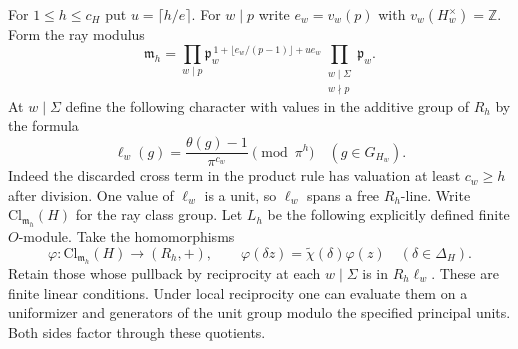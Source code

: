 \documentclass[a4paper,11pt]{article}
\theoremstyle{definition}
\theoremstyle{remark}
\newcommand{\ZZ}{\mathbb Z}\newcommand{\ord}{\operatorname{ord}}
\numberwithin{equation}{section}
\begin{document}
For \(1\le h\le c_H\) put \(u=\lceil h/e\rceil\). For \(w\mid p\)
write \(e_w=v_w(p)\) with \(v_w(H_w^\times)=\ZZ\). Form the ray modulus
\[
 \mathfrak m_h=
 \prod_{w\mid p}\mathfrak p_w^{\,1+\lfloor e_w/(p-1)\rfloor+u e_w}
 \prod_{\substack{w\mid\Sigma\\w\nmid p}}\mathfrak p_w .
\]
At \(w\mid\Sigma\) define the following character with values in
the additive group of \(R_h\) by the formula
\[
         \ell_w(g)=\frac{\theta(g)-1}{\pi^{c_w}}\pmod{\pi^h}
                          \quad(g\in G_{H_w}).
\]
Indeed the discarded cross term in the product rule has valuation
at least \(c_w\ge h\) after division. One value of \(\ell_w\)
is a unit, so \(\ell_w\) spans a free \(R_h\)-line.
Write \(\mathrm{Cl}_{\mathfrak m_h}(H)\) for the ray class group.
Let \(L_h\) be the following explicitly defined finite \(O\)-module.
Take the homomorphisms
\[
 \varphi:\mathrm{Cl}_{\mathfrak m_h}(H)\longrightarrow (R_h,+),
 \qquad \varphi(\delta z)=\widetilde\chi(\delta)\varphi(z)
                         \quad(\delta\in\Delta_H).
\]
Retain those whose pullback by reciprocity at each \(w\mid\Sigma\)
is in \(R_h\ell_w\). These are finite linear conditions. Under local reciprocity one
can evaluate them on a uniformizer and generators of the unit
group modulo the specified principal units. Both sides factor
through these quotients.
\end{document}
